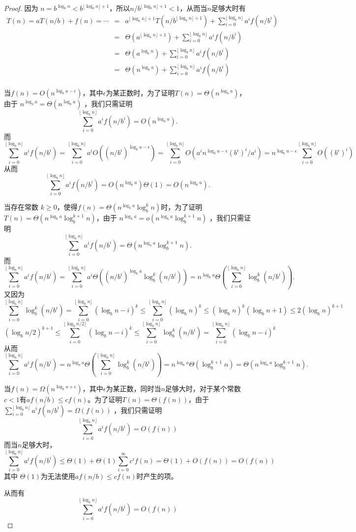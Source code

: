 \documentclass[12pt, a4paper, oneside]{article}
\begin{document}
\begin{proof}
   因为 $n = b^{\log_bn}< b^{\lfloor \log_bn\rfloor+1}$，所以$n/b^{\lfloor\log_bn\rfloor+1}<1$，从而当$n$足够大时有
   \[
   \begin{array}{rcl}
   T(n)=aT(n/b)+f(n)=\cdots&=&a^{\lfloor\log_bn\rfloor+1}T(n/b^{\lfloor\log_bn\rfloor+1})+\sum_{i=0}^{\lfloor\log_bn\rfloor}a^if(n/b^i)\\
                           &=&\Theta(a^{\lfloor\log_bn\rfloor+1})+\sum_{i=0}^{\lfloor\log_bn\rfloor}a^if(n/b^i)\\
                           &=&\Theta(a^{\log_bn})+\sum_{i=0}^{\lfloor\log_bn\rfloor}a^if(n/b^i)\\
                           &=&\Theta(n^{\log_ba})+\sum_{i=0}^{\lfloor\log_bn\rfloor}a^if(n/b^i)\\
   \end{array}
\]

当$f(n)=O(n^{\log_ba-\epsilon})$，其中$\epsilon$为某正数时，为了证明$T(n)=\Theta(n^{\log_ba})$，由于 $n^{\log_ba}=\Theta(n^{\log_ba})$ ，我们只需证明 
\[\sum_{i=0}^{\lfloor\log_bn\rfloor}a^if(n/b^i)=O(n^{\log_ba}).\]
而
     \[\sum_{i=0}^{\lfloor\log_bn\rfloor}a^if(n/b^i)=\sum_{i=0}^{\lfloor\log_bn\rfloor}a^iO((n/b^i)^{\log_ba-\epsilon})=\sum_{i=0}^{\lfloor\log_bn\rfloor}O(a^in^{\log_ba-\epsilon}(b^{\epsilon})^{i}/a^i)=n^{\log_ba-\epsilon}\sum_{i=0}^{\lfloor\log_bn\rfloor}O((b^{\epsilon})^{i})\]
从而
\[\sum_{i=0}^{\lfloor\log_bn\rfloor}a^if(n/b^i)=O(n^{\log_ba})\Theta(1)=O(n^{\log_ba}).\]

当存在常数 $k\geq 0$，使得$f(n)=\Theta(n^{\log_ba}\log_b^kn)$时，为了证明$T(n)=\Theta(n^{\log_ba}\log_b^{k+1}n)$，由于 $n^{\log_ba}=o(n^{\log_ba}\log_b^{k+1}n)$ ，我们只需证明
\[\sum_{i=0}^{\lfloor\log_bn\rfloor}a^if(n/b^i)=\Theta(n^{\log_ba}\log_b^{k+1}n).\]
而
\[\sum_{i=0}^{\lfloor\log_bn\rfloor}a^if(n/b^i)=\sum_{i=0}^{\lfloor\log_bn\rfloor}a^i\Theta((n/b^i)^{\log_ba}\log_b^k(n/b^i))=n^{\log_ba}\Theta(\sum_{i=0}^{\lfloor\log_bn\rfloor}\log_b^k(n/b^i)).\]
又因为
\[\sum_{i=0}^{\lfloor\log_bn\rfloor}\log_b^k(n/b^i)=\sum_{i=0}^{\lfloor\log_bn\rfloor}(\log_b n-i)^k\leq\sum_{i=0}^{\lfloor\log_bn\rfloor}(\log_b n)^k\leq(\log_b n)^k(\log_bn+1)\leq 2(\log_b n)^{k+1}\]
\[(\log_b n/2)^{k+1}\leq\sum_{i=0}^{\lfloor\log_bn/2\rfloor}(\log_b n-i)^k\leq\sum_{i=0}^{\lfloor\log_bn\rfloor}\log_b^k(n/b^i)=\sum_{i=0}^{\lfloor\log_bn\rfloor}(\log_b n-i)^k\]
从而
\[\sum_{i=0}^{\lfloor\log_bn\rfloor}a^if(n/b^i)=n^{\log_ba}\Theta(\sum_{i=0}^{\lfloor\log_bn\rfloor}\log_b^k(n/b^i))=n^{\log_ba}\Theta(\log_b^{k+1}n)=\Theta(n^{\log_ba}\log_b^{k+1}n).\]

当$f(n)=\Omega(n^{\log_ba+\epsilon})$，其中$\epsilon$为某正数，同时当$n$足够大时，对于某个常数$c<1$有$af(n/b)\leq cf(n)$。为了证明$T(n)=\Theta(f(n))$，由于 $\sum_{i=0}^{\lfloor\log_bn\rfloor}a^if(n/b^i)=\Omega(f(n))$ ，我们只需证明
\[\sum_{i=0}^{\lfloor\log_bn\rfloor}a^if(n/b^i)=O(f(n))\]
而当$n$足够大时，
\[\sum_{i=0}^{\lfloor\log_bn\rfloor}a^if(n/b^i)\leq \Theta(1)+\Theta(1)\sum_{i=0}^{\infty}c^if(n)=\Theta(1)+O(f(n))=O(f(n))\]
其中 $\Theta(1)$为无法使用$af(n/b)\leq cf(n)$时产生的项。

从而有
\[\sum_{i=0}^{\lfloor\log_bn\rfloor}a^if(n/b^i)=O(f(n))\]
\end{proof}
\end{document}
